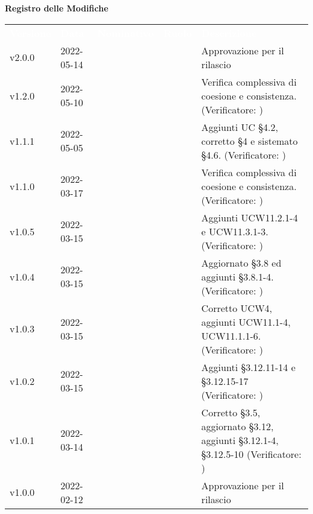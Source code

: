 
{\LARGE{\textbf{Registro delle Modifiche}}} \\
\renewcommand{\arraystretch}{1.5}
\begin{longtable}{ m{}<{\centering}  m{}<{\centering}  m{}<{\centering}  m{}<{\centering}  m{}<{\centering} }
	\rowcolor{darkblue}
	\textcolor{white}{\textbf{Versione}} &\textcolor{white}{\textbf{Data}}& \textcolor{white}{\textbf{Nominativo}} & \textcolor{white}{\textbf{Ruolo}}&\textcolor{white}{\textbf{Descrizione}}\\ 

	v2.0.0 & 2022-05-14 & \MG & \RE & Approvazione per il rilascio \\

	v1.2.0 & 2022-05-10 & \GC & \AN & Verifica complessiva di coesione e consistenza. (Verificatore: \textit{\PV}) \\

	v1.1.1 & 2022-05-05& \GC & \AN{} & Aggiunti UC \S{}4.2, corretto \S{}4 e sistemato \S{}4.6. (Verificatore: \textit{\PV})  \\	

	v1.1.0 & 2022-03-17 & \FP & \AN & Verifica complessiva di coesione e consistenza. (Verificatore: \textit{\PV}) \\	

	v1.0.5 & 2022-03-15& \LW & \AN{} & Aggiunti UCW11.2.1-4 e UCW11.3.1-3. (Verificatore: \textit{\PV})  \\

	v1.0.4 & 2022-03-15& \FP & \AN{} & Aggiornato \S{}3.8 ed aggiunti \S{}3.8.1-4. (Verificatore: \textit{\PV})  \\

	v1.0.3 & 2022-03-15& \GC & \AN{} & Corretto UCW4, aggiunti UCW11.1-4, UCW11.1.1-6. (Verificatore: \textit{\PV})  \\

	v1.0.2 & 2022-03-15& \LW & \AN{} & Aggiunti \S{}3.12.11-14 e \S{}3.12.15-17 (Verificatore: \textit{\PV})  \\

	v1.0.1 & 2022-03-14& \GC & \AN{} & Corretto \S{}3.5, aggiornato \S{}3.12, aggiunti \S{}3.12.1-4, \S{}3.12.5-10 (Verificatore: \textit{\PV})  \\
	
	v1.0.0& 2022-02-12& \EP{} &  \RE{}  & Approvazione per il rilascio\\


\end{longtable}
